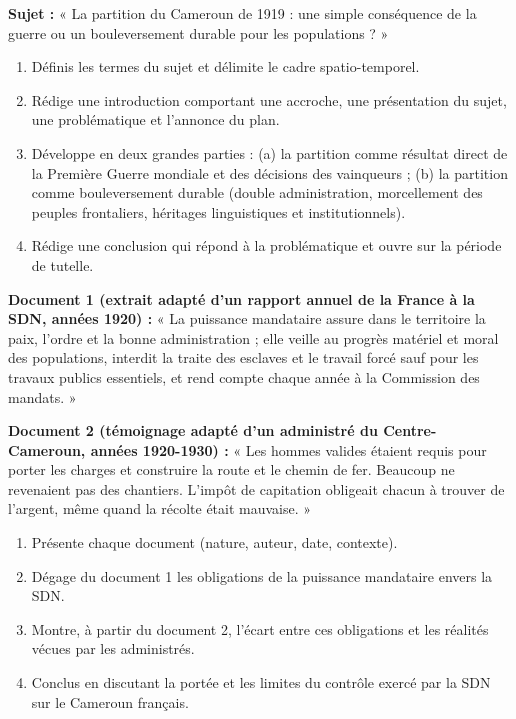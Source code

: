 \documentclass[11pt]{article}
\newcounter{popsec}
\newcounter{popsub}
\newcommand{\courssub}[1]{%
  \stepcounter{popsub}%
  \par\vspace{9pt}\noindent{\popxbold\fontsize{11.5}{13}\selectfont\color{popink}{\color{poporange}\thepopsec.\thepopsub}\hspace{6pt}#1}\par\nopagebreak\vspace{4pt}
}
\begin{document}
\courssub{Je me prépare au Bac}

\begin{exercice}
\textbf{Sujet :} « La partition du Cameroun de 1919 : une simple conséquence de la guerre ou un bouleversement durable pour les populations ? »

\begin{enumerate}
\item Définis les termes du sujet et délimite le cadre spatio-temporel.
\item Rédige une introduction comportant une accroche, une présentation du sujet, une problématique et l'annonce du plan.
\item Développe en deux grandes parties : (a) la partition comme résultat direct de la Première Guerre mondiale et des décisions des vainqueurs ; (b) la partition comme bouleversement durable (double administration, morcellement des peuples frontaliers, héritages linguistiques et institutionnels).
\item Rédige une conclusion qui répond à la problématique et ouvre sur la période de tutelle.
\end{enumerate}
\end{exercice}

\begin{exercice}
\textbf{Document 1 (extrait adapté d'un rapport annuel de la France à la SDN, années 1920) :} « La puissance mandataire assure dans le territoire la paix, l'ordre et la bonne administration ; elle veille au progrès matériel et moral des populations, interdit la traite des esclaves et le travail forcé sauf pour les travaux publics essentiels, et rend compte chaque année à la Commission des mandats. »

\textbf{Document 2 (témoignage adapté d'un administré du Centre-Cameroun, années 1920-1930) :} « Les hommes valides étaient requis pour porter les charges et construire la route et le chemin de fer. Beaucoup ne revenaient pas des chantiers. L'impôt de capitation obligeait chacun à trouver de l'argent, même quand la récolte était mauvaise. »

\begin{enumerate}
\item Présente chaque document (nature, auteur, date, contexte).
\item Dégage du document 1 les obligations de la puissance mandataire envers la SDN.
\item Montre, à partir du document 2, l'écart entre ces obligations et les réalités vécues par les administrés.
\item Conclus en discutant la portée et les limites du contrôle exercé par la SDN sur le Cameroun français.
\end{enumerate}
\end{exercice}
\end{document}

